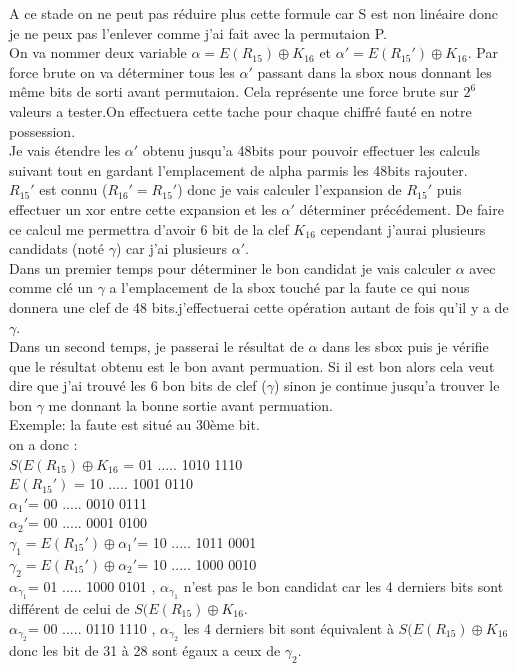 \documentclass[a4paper]{report}
\begin{document}
			A ce stade on ne peut pas réduire plus cette formule car S est non linéaire donc je ne peux pas l'enlever comme j'ai fait avec la permutaion P.\\
			On va nommer deux variable $\alpha = E(R_{15})\oplus K_{16}$ et $\alpha' = E(R_{15}')\oplus K_{16}$.
			Par force brute on va déterminer tous les $\alpha'$ passant dans la sbox nous donnant les même bits de sorti avant permutaion. Cela représente une force brute sur $2^{6}$valeurs a tester.On effectuera cette tache pour chaque chiffré fauté en notre possession.\\
			Je vais étendre les $\alpha'$ obtenu jusqu'a 48bits pour pouvoir effectuer les calculs suivant tout en gardant l'emplacement de alpha parmis les 48bits rajouter.\\
			$R_{15}'$ est connu ($R_{16}'=R_{15}'$) donc je vais calculer l'expansion de $R_{15}'$ puis effectuer un xor entre cette expansion et les $\alpha'$ déterminer précédement. De faire ce calcul me permettra d'avoir 6 bit de la clef $K_{16}$ cependant j'aurai plusieurs candidats (noté $\gamma$) car j'ai plusieurs $\alpha'$.\\
			Dans un premier temps pour déterminer le bon candidat je vais calculer $\alpha$ avec comme clé un $\gamma$ a l'emplacement de la sbox touché par la faute ce qui nous donnera une clef de 48 bits.j'effectuerai cette opération autant de fois qu'il y a de $\gamma$.\\
			Dans un second temps, je passerai le résultat de $\alpha$ dans les sbox puis je vérifie que le résultat obtenu est le bon avant permuation. Si il est bon alors cela veut dire que j'ai trouvé les 6 bon bits de clef ($\gamma$) sinon je continue jusqu'a trouver le bon $\gamma$ me donnant la bonne sortie avant permuation.\\
			
			Exemple: la faute est situé au 30ème bit.\\
			
			on a donc :\\
			$S(E(R_{15})\oplus K_{16}$ = 01 ..... 1010 1110\\
			$E(R_{15}')$ = 10 ..... 1001 0110\\
			$\alpha_1'$= 00 ..... 0010 0111\\
			$\alpha_2'$= 00 ..... 0001 0100\\
			$\gamma_1=E(R_{15}')\oplus \alpha_1'$= 10 ..... 1011 0001\\
			$\gamma_2=E(R_{15}')\oplus \alpha_2'$= 10 ..... 1000 0010\\
			$\alpha_{\gamma_1}$= 01 ..... 1000 0101 , $\alpha_{\gamma_1}$ n'est pas le bon candidat car les 4 derniers bits sont différent de celui de $S(E(R_{15})\oplus K_{16}$.\\
			$\alpha_{\gamma_2}$= 00 ..... 0110 1110 , $\alpha_{\gamma_2}$ les 4 derniers bit sont équivalent à $S(E(R_{15})\oplus K_{16}$ donc les bit de 31 à 28 sont égaux a ceux de $\gamma_2$.\\
			
\end{document}
